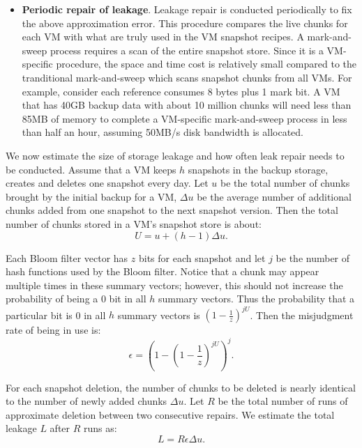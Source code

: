 \begin{itemize}
\item {\bf Periodic repair of leakage}.
Leakage repair is conducted periodically to fix the above approximation error.
This procedure compares the live chunks for each VM with what are truly used in the VM snapshot recipes.
A mark-and-sweep process  requires a scan of the entire snapshot store.
Since it is a VM-specific procedure, 
the space and time cost is relatively small compared to the tranditional mark-and-sweep
which scans snapshot chunks from all VMs.
For example, consider each reference consumes 8 bytes plus  1 mark bit. A VM that has 40GB backup data with about
10 million chunks will need less than 85MB of memory to complete a VM-specific mark-and-sweep process
in less than half an hour, assuming 50MB/s disk bandwidth is allocated.
\end{itemize}

We now estimate the size of storage leakage and how often leak repair needs to be conducted.
Assume that  a VM keeps $h$ snapshots in the backup storage, creates and deletes one snapshot
every day. Let $u$ be the total number of chunks brought by the initial backup for a VM, $\Delta u$ be the average
number of additional chunks added from one snapshot to the next snapshot version. Then the total number of 
chunks stored in a VM's snapshot store is about:
\[
U = u + (h-1)\Delta u.
\]

Each Bloom filter vector has  $z$ bits for each snapshot and let $j$ be the number of hash functions used by the
Bloom filter.  Notice that a chunk may appear multiple times in these summary vectors; however, this should not 
increase the probability of being a 0 bit in all $h$ summary vectors.
Thus the probability that a particular bit is 0  in all $h$ summary vectors is  
$(1- \frac{1}{z}) ^{j U}$. 
Then the misjudgment rate of being in use  is: 
\begin{equation}
\label{eq:falserate}
\epsilon = (1-(1-\frac{1}{z})^{jU})^j.
\end{equation}

For each snapshot deletion, the number of chunks to be deleted is nearly identical to the number of
newly added chunks $\Delta u$. 
Let $R$ be the total number of runs of approximate deletion between two consecutive 
repairs. We estimate  the total leakage $L$ after $R$ runs as:
\[
L = R \epsilon \Delta u.
\]

